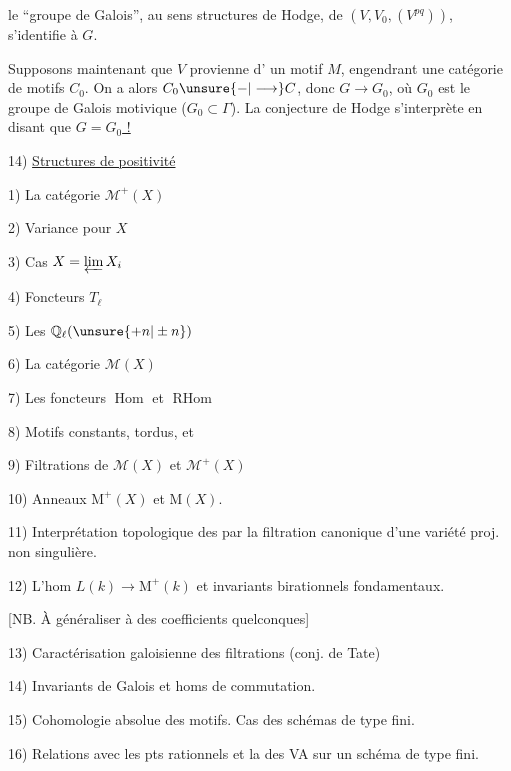 le ``groupe de Galois'', au sens structures de
Hodge, de $(V,V_0,(V^{pq}))$, s'identifie à $G$.

Supposons maintenant que $V$ provienne d'
un motif $M$, engendrant une \inserted{$\otimes$-}catégorie de
motifs $C_0$. On a alors $C_0\unsure{-|\longrightarrow}C$, donc
$G\longrightarrow G_0$, où $G_0$ est le groupe de Galois
motivique ($G_0\subset\Gamma$). La conjecture de
Hodge s'interprète en disant que \uline{$G=G_0$ !}

14) \uline{Structures de positivité}


1) La catégorie $\mathcal{M}^+(X)$

2) Variance pour $X$

3) Cas $X=\varprojlim X_i$

4) Foncteurs $T_\ell$

5) Les $\mathbb{Q}_\ell(\unsure{+n|\pm n})$

6) La catégorie $\mathcal{M}(X)$

7) Les foncteurs $\operatorname{Hom}$ et $\operatorname{RHom}$

8) Motifs constants, tordus, et 

9) Filtrations de $\mathcal{M}(X)$ et $\mathcal{M}^+(X)$

10) Anneaux $\mathrm{M}^+(X)$ et $\mathrm{M}(X)$.

11) Interprétation topologique des
par la filtration canonique d'une variété proj. non singulière.

12) L'hom $L(k)\longrightarrow \mathrm{M}^+(k)$ et invariants birationnels fondamentaux.

[NB. À généraliser à des coefficients quelconques]

13) Caractérisation galoisienne des filtrations (conj. de Tate)

14) Invariants de Galois et homs de commutation.

15) Cohomologie absolue des motifs. Cas des schémas de type fini.

16) Relations avec les pts rationnels et la  des VA sur
un schéma de type fini.

